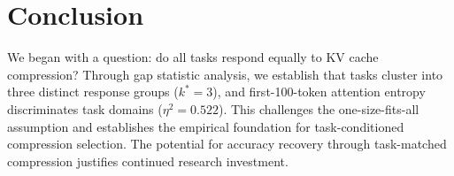 \section{Conclusion}

We began with a question: do all tasks respond equally to KV cache compression? Through gap statistic analysis, we establish that tasks cluster into three distinct response groups ($k^* = 3$), and first-100-token attention entropy discriminates task domains ($\eta^2 = 0.522$). This challenges the one-size-fits-all assumption and establishes the empirical foundation for task-conditioned compression selection. The potential for accuracy recovery through task-matched compression justifies continued research investment.
